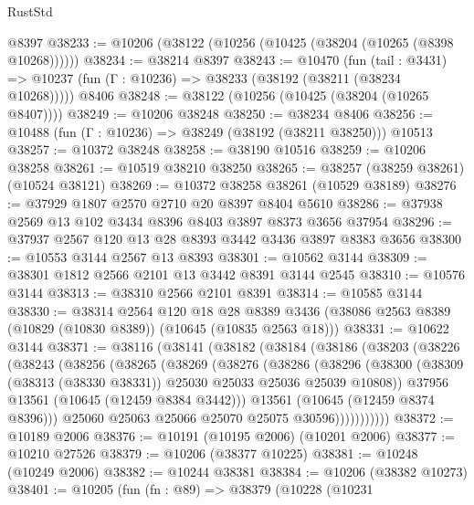 \begin{lexlean}{RustStd}
\begin{coremodule}
    @8397
@38233 := @10206 (@38122 (@10256 (@10425 (@38204 (@10265 (@8398 @10268))))))
@38234 := @38214 @8397
@38243 := @10470
    (fun (tail : @3431) => @10237 (fun (Γ : @10236) => @38233 (@38192 (@38211 (@38234 @10268)))))
    @8406
@38248 := @38122 (@10256 (@10425 (@38204 (@10265 @8407))))
@38249 := @10206 @38248
@38250 := @38234 @8406
@38256 := @10488 (fun (Γ : @10236) => @38249 (@38192 (@38211 @38250))) @10513
@38257 := @10372 @38248
@38258 := @38190 @10516
@38259 := @10206 @38258
@38261 := @10519 @38210 @38250
@38265 := @38257 (@38259 @38261) (@10524 @38121)
@38269 := @10372 @38258 @38261 (@10529 @38189)
@38276 := @37929 @1807 @2570 @2710 @20 @8397 @8404 @5610
@38286 := @37938 @2569 @13 @102 @3434 @8396 @8403 @3897 @8373 @3656 @37954
@38296 := @37937 @2567 @120 @13 @28 @8393 @3442 @3436 @3897 @8383 @3656
@38300 := @10553 @3144 @2567 @13 @8393
@38301 := @10562 @3144
@38309 := @38301 @1812 @2566 @2101 @13 @3442 @8391 @3144 @2545
@38310 := @10576 @3144
@38313 := @38310 @2566 @2101 @8391
@38314 := @10585 @3144
@38330 := @38314
    @2564
    @120
    @18
    @28
    @8389
    @3436
    (@38086 @2563 @8389 (@10829 (@10830 @8389)) (@10645 (@10835 @2563 @18)))
@38331 := @10622 @3144
@38371 := @38116
    (@38141
      (@38182
        (@38184
          (@38186
            (@38203
              (@38226
                (@38243
                  (@38256
                    (@38265
                      (@38269
                        (@38276
                          (@38286
                            (@38296
                              (@38300
                                (@38309
                                  (@38313 (@38330 @38331))
                                  @25030
                                  @25033
                                  @25036
                                  @25039
                                  @10808))
                              @37956
                              @13561
                              (@10645 (@12459 @8384 @3442)))
                            @13561
                            (@10645 (@12459 @8374 @8396)))
                          @25060
                          @25063
                          @25066
                          @25070
                          @25075
                          @30596)))))))))))
@38372 := @10189 @2006
@38376 := @10191 (@10195 @2006) (@10201 @2006)
@38377 := @10210 @27526
@38379 := @10206 (@38377 @10225)
@38381 := @10248 (@10249 @2006)
@38382 := @10244 @38381
@38384 := @10206 (@38382 @10273)
@38401 := @10205
    (fun (fn : @89) =>
    @38379
      (@10228
        (@10231

\end{coremodule}
\end{lexlean}
